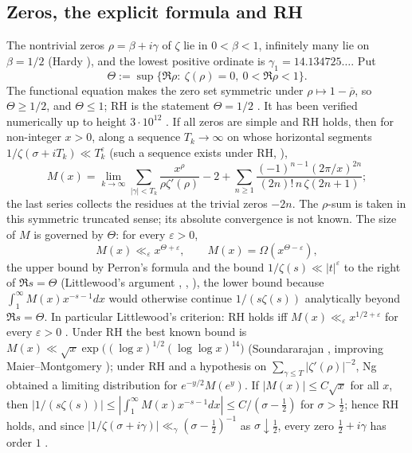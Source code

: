 \documentclass[11pt]{amsart}
\numberwithin{equation}{section}
\theoremstyle{plain}
\theoremstyle{definition}
\theoremstyle{remark}
\newcommand{\eps}{\varepsilon}
\begin{document}
\subsection{Zeros, the explicit formula and RH}
The nontrivial zeros $\rho=\beta+i\gamma$ of $\zeta$ lie in $0<\beta<1$,
infinitely many lie on $\beta=1/2$ (Hardy \cite{Hardy1914}), and the lowest
positive ordinate is $\gamma_1=14.134725\ldots$. Put
\[
\Theta:=\sup\{\Re\rho:\ \zeta(\rho)=0,\ 0<\Re\rho<1\}.
\]
The functional equation makes the zero set symmetric under
$\rho\mapsto1-\overline\rho$, so $\Theta\ge1/2$, and $\Theta\le1$; RH is the
statement $\Theta=1/2$ \cite{Riemann1859}. It
has been verified numerically up to height $3\cdot10^{12}$
\cite{PlattTrudgian2021}. If all zeros are simple and RH holds, then for non-integer $x>0$,
along a sequence $T_k\to\infty$ on whose horizontal segments
$1/\zeta(\sigma+iT_k)\ll T_k^{\eps}$ (such a sequence exists under RH,
\cite[\S14.16]{Titchmarsh1986}), \cite[\S14.27]{Titchmarsh1986}
\[
M(x)=\lim_{k\to\infty}\sum_{|\gamma|<T_k}\frac{x^\rho}{\rho\zeta'(\rho)}-2+
\sum_{n\ge1}\frac{(-1)^{n-1}(2\pi/x)^{2n}}{(2n)!\,n\,\zeta(2n+1)} ;
\]
the last series collects the residues at the trivial zeros $-2n$. The
$\rho$-sum is taken in this symmetric truncated sense; its absolute
convergence is not known.
The size of $M$ is governed by $\Theta$: for every $\eps>0$,
\[
M(x)\ll_\eps x^{\Theta+\eps},\qquad M(x)=\Omega(x^{\Theta-\eps}),
\]
the upper bound by Perron's formula and the bound $1/\zeta(s)\ll|t|^{\eps}$
to the right of $\Re s=\Theta$ (Littlewood's argument
\cite{Littlewood1912}, \cite[\S14.25]{Titchmarsh1986}, \cite[\S4]{Pintz2026}),
the lower bound because $\int_1^\infty M(x)x^{-s-1}dx$ would otherwise
continue $1/(s\zeta(s))$ analytically beyond $\Re s=\Theta$. In particular
Littlewood's criterion: RH holds iff $M(x)\ll_\eps x^{1/2+\eps}$ for every
$\eps>0$ \cite{Littlewood1912}. Under RH the best known bound is
$M(x)\ll\sqrt x\exp\bigl((\log x)^{1/2}(\log\log x)^{14}\bigr)$
(Soundararajan \cite{Soundararajan2009}, improving Maier--Montgomery
\cite{MaierMontgomery2009}); under RH and a hypothesis on
$\sum_{\gamma\le T}|\zeta'(\rho)|^{-2}$, Ng \cite{Ng2004} obtained a limiting
distribution for $e^{-y/2}M(e^y)$. If $|M(x)|\le C\sqrt x$ for all $x$, then
$|1/(s\zeta(s))|\le|\int_1^\infty M(x)x^{-s-1}dx|\le C/(\sigma-\frac12)$
for $\sigma>\frac12$; hence RH holds, and since
$|1/\zeta(\sigma+i\gamma)|\ll_\gamma(\sigma-\frac12)^{-1}$ as
$\sigma\downarrow\frac12$, every zero $\frac12+i\gamma$ has order $1$
\cite[\S14.29]{Titchmarsh1986}.
\end{document}
